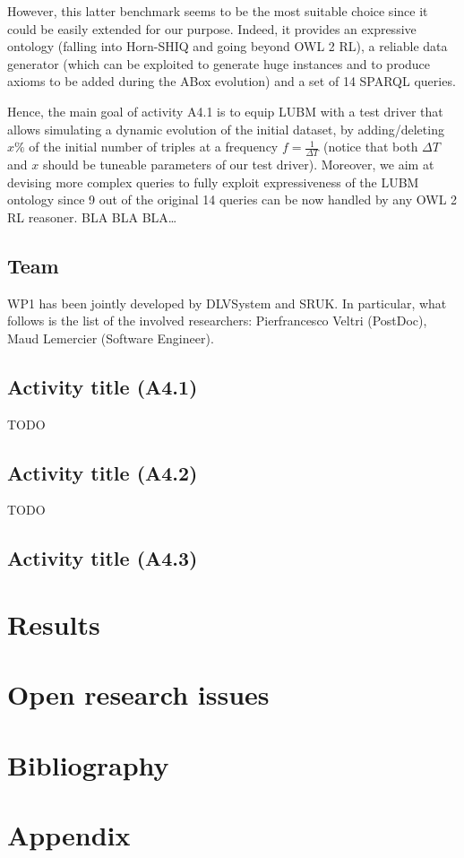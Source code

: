 \documentclass[oneside]{book}
\begin{document}
However, this latter benchmark seems to be the most suitable choice since it could be easily extended for our purpose. Indeed, it provides an expressive ontology (falling into Horn-SHIQ and going beyond OWL 2 RL), a reliable data generator (which can be exploited to generate huge instances and to produce axioms to be added during the ABox evolution) and a set of 14 SPARQL queries.


Hence, the main goal of activity A4.1 is to equip LUBM with a test driver that allows simulating a dynamic evolution of the initial dataset, by adding/deleting $x\%$  of the initial number of triples at a frequency $f=\frac{1}{\Delta T}$ (notice that both $\Delta T$ and $x$ should be tuneable parameters of our test driver). Moreover, we aim at devising more complex queries to fully exploit expressiveness of the LUBM ontology since 9 out of the original 14 queries can be now handled by any OWL 2 RL reasoner.
BLA BLA BLA… 


\section{Team}
WP1 has been jointly developed by DLVSystem and SRUK. In particular, what follows is the list of the involved researchers: Pierfrancesco Veltri (PostDoc), Maud Lemercier (Software Engineer).

\section{Activity title (A4.1)}
TODO
\section{Activity title (A4.2)}
TODO
\section{Activity title (A4.3)}


\chapter{Results}
\chapter{Open research issues}
\chapter{Bibliography}
\chapter{Appendix}
\end{document}
